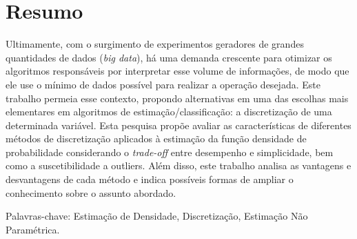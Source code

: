 %
%
\chapter*{Resumo}
\vspace{-2cm}

\noindent 
\vspace{0.5cm}

Ultimamente, com o surgimento de experimentos geradores de grandes quantidades de dados (\textit{big data}), há uma demanda crescente para otimizar os algoritmos responsáveis por interpretar esse volume de informações, de modo que ele use o mínimo de dados possível para realizar a operação desejada. Este trabalho permeia esse contexto, propondo alternativas em uma das escolhas mais elementares em algoritmos de estimação/classificação: a discretização de uma determinada variável. Esta pesquisa propõe avaliar as características de diferentes métodos de discretização aplicados à estimação da função densidade de probabilidade considerando o \textit{trade-off} entre desempenho e simplicidade, bem como a suscetibilidade a outliers. Além disso, este trabalho analisa as vantagens e desvantagens de cada método e indica possíveis formas de ampliar o conhecimento sobre o assunto abordado.

\noindent Palavras-chave:  Estimação de Densidade, Discretização, Estimação Não Paramétrica.\\

\newpage


